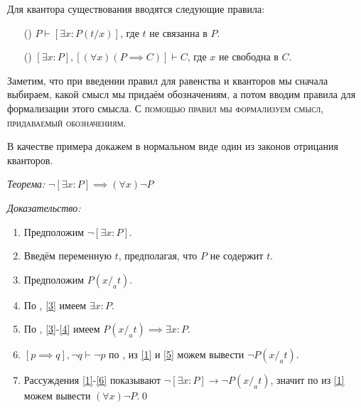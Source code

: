 Для квантора существования вводятся следующие правила:
\begin{enumerate}
	\item[(\Eii{})]$P\vdash [\exists x:P(t/x)]$, где $t$ не связанна в $P$.
	\item[(\Eee{})]$[\exists x:P],[(\forall x)(P\implies C)]\vdash C$,
	где $x$ не свободна в $C$.
\end{enumerate}

Заметим, что при введении правил для равенства и кванторов мы
сначала выбираем, какой смысл мы придаём обозначениям, а потом вводим
правила для формализации этого смысла.
\textsc{С помощью правил мы формализуем смысл, придаваемый обозначениям.}

В качестве примера докажем в нормальном виде один из законов отрицания кванторов.

{\it Теорема:} $\lnot [\exists x:P]\implies  (\forall x)\lnot P$

{\it Доказательство:}
\begin{enumerate}[label=(\arabic*)]
	\item{}\label{1}Предположим $\lnot [\exists x:P]$.
	\item{}\label{2}Введём переменную $t$, предполагая, что $P$ не содержит $t$.
	\item{}\label{3}Предположим $P(x/_{a}t)$.
	\item{}\label{4}По \Eii{}, \ref{3} имеем $\exists x:P$.
	\item{}\label{5}По \implic{}, \ref{3}-\ref{4} имеем
	$P(x/_{a}t)\implies \exists x:P$.
	\item{}\label{6}${[p\implies q],\lnot q\vdash \lnot p}$ по \taut{}, из
	\ref{1} и \ref{5} можем вывести $\lnot P(x/_{a}t)$.
	\item{}\label{7}Рассуждения \ref{1}-\ref{6} показывают
	$\lnot[\exists x:P]\to\lnot P(x/_{a}t)$, значит по \Aii{} из \ref{1} можем
	вывести $(\forall x)\lnot P$.\qed
\end{enumerate}

